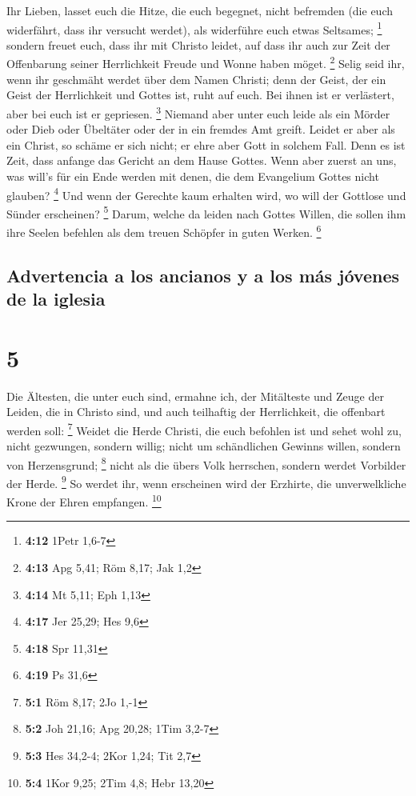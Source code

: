  Ihr Lieben, lasset euch die Hitze, die euch begegnet,
nicht befremden (die euch widerfährt, dass ihr versucht werdet), als
widerführe euch etwas Seltsames; \footnote{\textbf{4:12} 1Petr 1,6-7}
 sondern freuet euch, dass ihr mit Christo leidet, auf
dass ihr auch zur Zeit der Offenbarung seiner Herrlichkeit Freude und
Wonne haben möget. \footnote{\textbf{4:13} Apg 5,41; Röm 8,17; Jak 1,2}
 Selig seid ihr, wenn ihr geschmäht werdet über dem Namen
Christi; denn der Geist, der ein Geist der Herrlichkeit und Gottes ist,
ruht auf euch. Bei ihnen ist er verlästert, aber bei euch ist er
gepriesen. \footnote{\textbf{4:14} Mt 5,11; Eph 1,13} 
Niemand aber unter euch leide als ein Mörder oder Dieb oder Übeltäter
oder der in ein fremdes Amt greift.  Leidet er aber als
ein Christ, so schäme er sich nicht; er ehre aber Gott in solchem Fall.
 Denn es ist Zeit, dass anfange das Gericht an dem Hause
Gottes. Wenn aber zuerst an uns, was will's für ein Ende werden mit
denen, die dem Evangelium Gottes nicht glauben? \footnote{\textbf{4:17}
  Jer 25,29; Hes 9,6}  Und wenn der Gerechte kaum
erhalten wird, wo will der Gottlose und Sünder erscheinen? \footnote{\textbf{4:18}
  Spr 11,31}  Darum, welche da leiden nach Gottes Willen,
die sollen ihm ihre Seelen befehlen als dem treuen Schöpfer in guten
Werken. \footnote{\textbf{4:19} Ps 31,6}

\hypertarget{advertencia-a-los-ancianos-y-a-los-muxe1s-juxf3venes-de-la-iglesia}{%
\subsection{Advertencia a los ancianos y a los más jóvenes de la
iglesia}\label{advertencia-a-los-ancianos-y-a-los-muxe1s-juxf3venes-de-la-iglesia}}

\hypertarget{section-4}{%
\section{5}\label{section-4}}

 Die Ältesten, die unter euch sind, ermahne ich, der
Mitälteste und Zeuge der Leiden, die in Christo sind, und auch
teilhaftig der Herrlichkeit, die offenbart werden soll: \footnote{\textbf{5:1}
  Röm 8,17; 2Jo 1,-1}  Weidet die Herde Christi, die euch
befohlen ist und sehet wohl zu, nicht gezwungen, sondern willig; nicht
um schändlichen Gewinns willen, sondern von Herzensgrund; \footnote{\textbf{5:2}
  Joh 21,16; Apg 20,28; 1Tim 3,2-7}  nicht als die übers
Volk herrschen, sondern werdet Vorbilder der Herde. \footnote{\textbf{5:3}
  Hes 34,2-4; 2Kor 1,24; Tit 2,7}  So werdet ihr, wenn
erscheinen wird der Erzhirte, die unverwelkliche Krone der Ehren
empfangen. \footnote{\textbf{5:4} 1Kor 9,25; 2Tim 4,8; Hebr 13,20}

